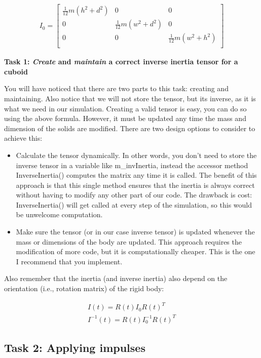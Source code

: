 \documentclass[12pt]{article}
\begin{document}
\begin{align}
I_0 = \begin{bmatrix}
\frac{1}{12}m(h^2+d^2) & 0 & 0\\ 
0 & \frac{1}{12}m(w^2+d^2) & 0\\ 
0 & 0 & \frac{1}{12}m(w^2+h^2)\\ 
\end{bmatrix}
\end{align}

\textbf{Task 1: \emph{Create} and \emph{maintain} a correct inverse inertia tensor for a cuboid}

You will have noticed that there are two parts to this task: creating and maintaining. Also notice that we will not store the tensor, but its inverse, as it is what we need in our simulation. Creating a valid tensor is easy, you can do so using the above formula. However, it must be updated any time the mass and dimension of the solids are modified. There are two design options to consider to achieve this: 

\begin{itemize}
\item Calculate the tensor dynamically. In other words, you don’t need to store the inverse tensor in a variable like m\_invInertia, instead the accessor method InverseInertia() computes the matrix any time it is called. The benefit of this approach is that this single method ensures that the inertia is always correct without having to modify any other part of our code. The drawback is cost: InverseInertia() will get called at every step of the simulation, so this would be unwelcome computation. 
\item Make sure the tensor (or in our case inverse tensor) is updated whenever the mass or dimensions of the body are updated. This approach requires the modification of more code, but it is computationally cheaper. This is the one I recommend that you implement. 
\end{itemize}

Also remember that the inertia (and inverse inertia) also depend on the orientation (i.e., rotation matrix) of the rigid body:

\begin{align}
I(t) = R(t)I_0R(t)^T \\
I^{-1}(t) = R(t)I_0^{-1}R(t)^T
\end{align}

\subsection*{Task 2: Applying impulses}
\end{document}

